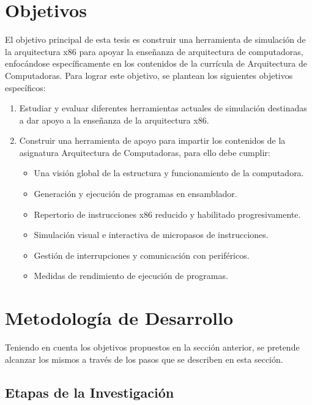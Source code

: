 \documentclass[12pt,twoside]{templates/unerthesis}
\providecommand{\tightlist}{%
  \setlength{\itemsep}{0pt}\setlength{\parskip}{0pt}}
\begin{document}
\hypertarget{objetivos}{%
\section{Objetivos}\label{objetivos}}

El objetivo principal de esta tesis es construir una herramienta de simulación de la arquitectura x86 para apoyar la enseñanza de arquitectura de computadoras, enfocándose específicamente en los contenidos de la currícula de Arquitectura de Computadoras. Para lograr este objetivo, se plantean los siguientes objetivos específicos:

\begin{enumerate}
\def\labelenumi{\arabic{enumi}.}
\tightlist
\item
  Estudiar y evaluar diferentes herramientas actuales de simulación destinadas a dar apoyo a la enseñanza de la arquitectura x86.
\item
  Construir una herramienta de apoyo para impartir los contenidos de la asignatura Arquitectura de Computadoras, para ello debe cumplir:

  \begin{itemize}
  \tightlist
  \item
    Una visión global de la estructura y funcionamiento de la computadora.
  \item
    Generación y ejecución de programas en ensamblador.
  \item
    Repertorio de instrucciones x86 reducido y habilitado progresivamente.
  \item
    Simulación visual e interactiva de micropasos de instrucciones.
  \item
    Gestión de interrupciones y comunicación con periféricos.
  \item
    Medidas de rendimiento de ejecución de programas.
  \end{itemize}
\end{enumerate}

\hypertarget{metodologuxeda-de-desarrollo}{%
\section{Metodología de Desarrollo}\label{metodologuxeda-de-desarrollo}}

Teniendo en cuenta los objetivos propuestos en la sección anterior, se pretende alcanzar los mismos a través de los pasos que se describen en esta sección.

\hypertarget{etapas-de-la-investigaciuxf3n}{%
\subsection{Etapas de la Investigación}\label{etapas-de-la-investigaciuxf3n}}
\end{document}

